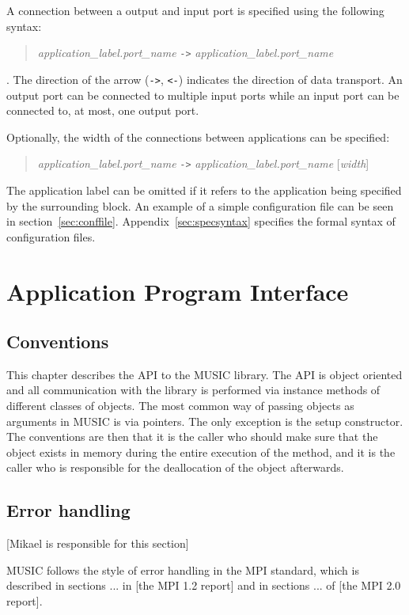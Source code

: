 \documentclass[a4paper]{report}
\newcommand{\responsible}[1]%
{{\color{red}[#1 is responsible for this section]}}
\begin{document}
A connection between a output and input port is specified using the
following syntax:
\begin{quote}
  \emph{application\_label.port\_name} \lstinline|->| \emph{application\_label.port\_name}
\end{quote}
\noindent.  The direction of the arrow (\lstinline|->|, \lstinline|<-|) indicates the
direction of data transport.  An output port can be connected to
multiple input ports while an input port can be connected to, at most,
one output port.

Optionally, the width of the connections between applications can be
specified:
\begin{quote}
  \emph{application\_label.port\_name} \lstinline|->|
  \emph{application\_label.port\_name} [\emph{width}]
\end{quote}
The application label can be omitted if it refers to the application
being specified by the surrounding block.
An example of a simple configuration file can be seen in
section~\ref{sec:conffile}.  Appendix~\ref{sec:specsyntax} specifies
the formal syntax of configuration files.


\chapter{Application Program Interface}

\section{Conventions}

This chapter describes the API to the MUSIC library.  The API is
object oriented and all communication with the library is performed
via instance methods of different classes of objects.  The most common
way of passing objects as arguments in MUSIC is via pointers.  The
only exception is the setup constructor.  The conventions are then
that it is the caller who should make sure that the object exists in
memory during the entire execution of the method, and it is the caller
who is responsible for the deallocation of the object afterwards.

\section{Error handling}
\responsible{Mikael}

MUSIC follows the style of error handling in the MPI standard, which
is described in sections ... in [the MPI 1.2 report] and in sections
... of [the MPI 2.0 report].
\end{document}
